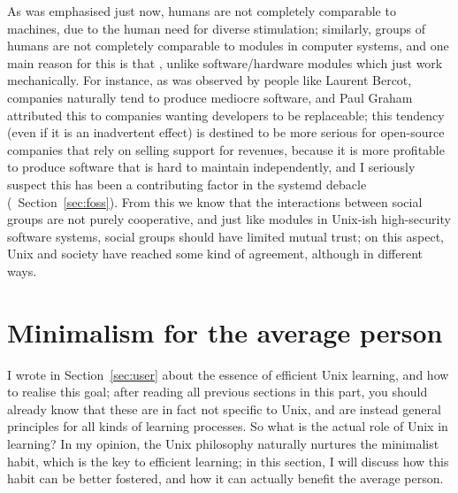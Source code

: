 As was emphasised just now, humans are not completely comparable to machines,
due to the human need for diverse stimulation; similarly, groups of humans
are not completely comparable to modules in computer systems, and one main
reason for this is that , unlike software/hardware modules which just work mechanically.  For
instance, as was observed by people like Laurent Bercot,
companies naturally tend to produce mediocre software, and Paul Graham
attributed this to companies wanting developers to be
replaceable; this tendency (even if it is an inadvertent effect) is destined
to be more serious for open-source companies that rely on selling support for
revenues, because it is more profitable to produce software that is hard to
maintain independently, and I seriously suspect this has been a contributing
factor in the systemd debacle (\cf~Section~\ref{sec:foss}).  From this we know
that the interactions between social groups are not purely cooperative, and just
like modules in Unix-ish high-security software systems,
social groups should have limited mutual trust; on this aspect, Unix and
society have reached some kind of agreement, although in different ways.

\section{Minimalism for the average person}\label{sec:worklife}

I wrote in Section~\ref{sec:user} about the essence of efficient Unix learning,
and how to realise this goal; after reading all previous sections in this part,
you should already know that these are in fact not specific to Unix, and are
instead general principles for all kinds of learning processes.  So what is
the actual role of Unix in learning?  In my opinion, the Unix philosophy
naturally nurtures the minimalist habit, which is the key to efficient
learning; in this section, I will discuss how this habit can be better
fostered, and how it can actually benefit the average person.

